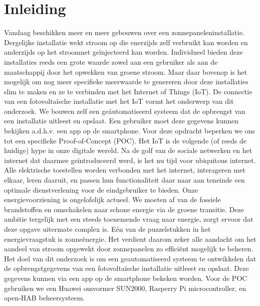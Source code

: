 \documentclass{hogent-article}
\affiliation{
    \textsuperscript{1} \href{mailto:bart.depaepe@student.hogent.be}{bart.depaepe@student.hogent.be}}
\begin{document}
    
    \flushbottom %
    \maketitle %
    \tableofcontents %
    \thispagestyle{empty} %
    
    
    \section{Inleiding}
    
    Vandaag beschikken meer en meer gebouwen over een zonnepaneleninstallatie. Dergelijke installatie wekt stroom op die enerzijds zelf verbruikt kan worden en anderzijds op het stroomnet geïnjecteerd kan worden. Individueel bieden deze installaties reeds een grote waarde zowel aan een gebruiker als aan de maatschappij door het opwekken van groene stroom. Maar daar bovenop is het mogelijk om nog meer specifieke meerwaarde te genereren door deze installaties slim te maken en ze te verbinden met het Internet of Things (IoT).
    De connectie van een fotovoltaïsche installatie met het IoT vormt het onderwerp van dit onderzoek. We bouwen zelf een geäutomatiseerd systeem dat de opbrengst van een installatie uitleest en opslaat. Een gebruiker moet deze gegevens kunnen bekijken a.d.h.v. een app op de smartphone. Voor deze opdracht beperken we ons tot een specifieke Proof-of-Concept (POC).
    Het IoT is de volgende (of reeds de huidige) hype in onze digitale wereld. Na de golf van de sociale netwerken en het internet dat daarmee geïntroduceerd werd, is het nu tijd voor ubiquitous internet. Alle elektrische toestellen worden verbonden met het internet, interageren met elkaar, leren daaruit, en passen hun functionaliteit daar naar aan teneinde een optimale dienstverlening voor de eindgebruiker te bieden.
    Onze energievoorziening is ongelofelijk actueel. We moeten af van de fossiele brandstoffen en omschakelen naar schone energie via de groene transitie. Deze ambitie tergelijk met een steeds toenemende vraag naar energie, zorgt ervoor dat deze opgave uitermate complex is. Eén van de puzzelstukken in het energievraagstuk is zonneënergie. Het verdient daarom zeker alle aandacht om het aandeel van stroom opgewekt door zonnepanelen zo efficiënt mogelijk te beheren.
    Het doel van dit onderzoek is om een geautomatiseerd systeem te ontwikkelen dat de opbrengstgegevens van een fotovoltaïsche installatie uitleest en opslaat. Deze gegevens kunnen via een app op de smartphone bekeken worden. Voor de POC gebruiken we een Huawei omvormer SUN2000, Rasperry Pi microcontroller, en open-HAB beheersysteem.
    
\end{document}
